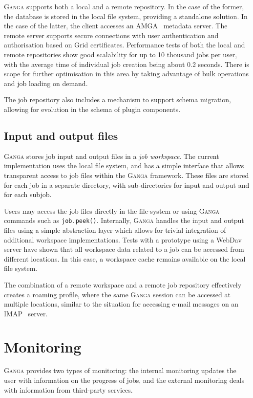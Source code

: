 \documentclass{elsart}
\def\ganga {\textsc{Ganga}\xspace}
\def\grid {Grid\xspace}
\begin{document}
\begin{linenumbers}
\ganga supports both a local and a remote repository. In the
case of the former, the database is stored in the local file system,
providing a standalone solution. 
In the case of the latter,
the client accesses an AMGA~\cite{AMGA} metadata
server. The remote server supports secure connections with user
authentication and authorisation based on \grid certificates.
Performance tests of both the local and remote repositories show good
scalability for up to 10 thousand jobs per user, with the average time
of individual job creation being about 0.2 seconds. There is scope for
further optimisation in this area by taking advantage of bulk
operations and job loading on demand.

The job repository also includes a mechanism to support schema migration,
allowing for evolution in the schema of plugin components.

\subsection{Input and output files}

\ganga stores job input and output files in a \emph{job workspace}. 
The current implementation uses the local file system, and has a simple
interface that allows transparent access to job files within the
\ganga framework. These files are stored for each job in a separate
directory, with sub-directories for input and output and for each subjob.

Users may access the job files directly in the file-system or using \ganga commands
such as \texttt{job.peek()}. Internally, \ganga handles the input and output
files using a simple abstraction layer which allows for trivial integration
of additional workspace implementations.
Tests with a prototype using a WebDav~\cite{WebDav}
server have shown that all workspace data related to a
job can be accessed from different locations. In this case, a workspace
cache remains available on the local file system.

The combination of a remote workspace and a remote job repository effectively
creates a roaming profile, where the same \ganga session can be accessed at
multiple locations, similar to the situation for accessing e-mail messages
on an IMAP~\cite{IMAP} server.

\section{Monitoring}
\label{sec:mon}
\ganga provides two types of monitoring: the internal monitoring updates
the user with information on the progress of jobs, and the external
monitoring deals with information from third-party services.


\end{linenumbers}
\end{document}
